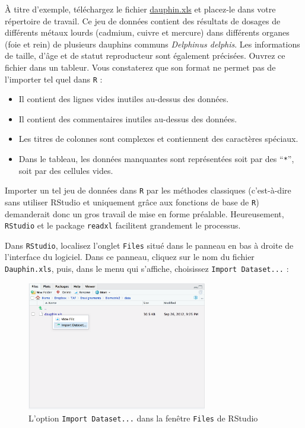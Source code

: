 \documentclass[
  letterpaper,
  DIV=11,
  numbers=noendperiod]{scrreprt}
\providecommand{\tightlist}{%
  \setlength{\itemsep}{0pt}\setlength{\parskip}{0pt}}\usepackage{longtable,booktabs,array}
\begin{document}
À titre d'exemple, téléchargez le fichier
\href{data/dauphin.xls}{dauphin.xls} et placez-le dans votre répertoire
de travail. Ce jeu de données contient des résultats de dosages de
différents métaux lourds (cadmium, cuivre et mercure) dans différents
organes (foie et rein) de plusieurs dauphins communs \emph{Delphinus
delphis}. Les informations de taille, d'âge et de statut reproducteur
sont également précisées. Ouvrez ce fichier dans un tableur. Vous
constaterez que son format ne permet pas de l'importer tel quel dans
\texttt{R} :

\begin{itemize}
\tightlist
\item
  Il contient des lignes vides inutiles au-dessus des données.
\item
  Il contient des commentaires inutiles au-dessus des données.
\item
  Les titres de colonnes sont complexes et contiennent des caractères
  spéciaux.
\item
  Dans le tableau, les données manquantes sont représentées soit par des
  ``\texttt{*}'', soit par des cellules vides.
\end{itemize}

Importer un tel jeu de données dans \texttt{R} par les méthodes
classiques (c'est-à-dire sans utiliser RStudio et uniquement grâce aux
fonctions de base de \texttt{R}) demanderait donc un gros travail de
mise en forme préalable. Heureusement, \texttt{RStudio} et le package
\texttt{readxl} facilitent grandement le processus.

Dans \texttt{RStudio}, localisez l'onglet \texttt{Files} situé dans le
panneau en bas à droite de l'interface du logiciel. Dans ce panneau,
cliquez sur le nom du fichier \texttt{Dauphin.xls}, puis, dans le menu
qui s'affiche, choisissez \texttt{Import\ Dataset...} :

\begin{figure}

{\centering \includegraphics[width=0.7\textwidth,height=\textheight]{./images/import.png}

}

\caption{L'option \texttt{Import\ Dataset...} dans la fenêtre
\texttt{Files} de RStudio}

\end{figure}
\end{document}
